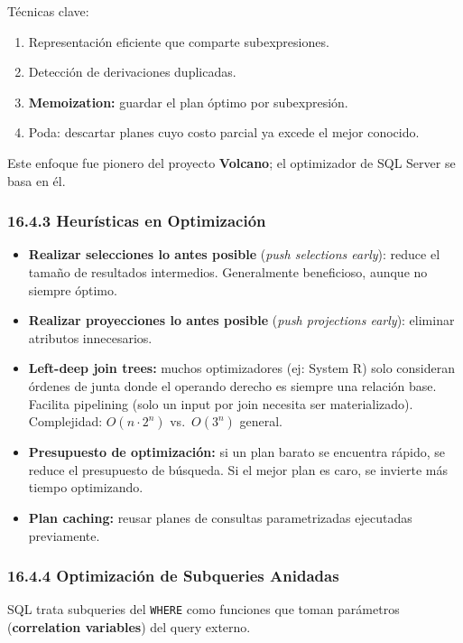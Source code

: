 \documentclass[11pt, a4paper]{article}
\begin{document}
Técnicas clave:
\begin{enumerate}[nosep]
	\item Representación eficiente que comparte subexpresiones.
	\item Detección de derivaciones duplicadas.
	\item \textbf{Memoization:} guardar el plan óptimo por subexpresión.
	\item Poda: descartar planes cuyo costo parcial ya excede el mejor conocido.
\end{enumerate}

Este enfoque fue pionero del proyecto \textbf{Volcano}; el optimizador de SQL Server se basa en él.

\subsubsection{16.4.3 Heurísticas en Optimización}

\begin{itemize}[nosep]
	\item \textbf{Realizar selecciones lo antes posible} (\textit{push selections early}): reduce el tamaño de resultados intermedios. Generalmente beneficioso, aunque no siempre óptimo.
	\item \textbf{Realizar proyecciones lo antes posible} (\textit{push projections early}): eliminar atributos innecesarios.
	\item \textbf{Left-deep join trees:} muchos optimizadores (ej: System R) solo consideran órdenes de junta donde el operando derecho es siempre una relación base. Facilita pipelining (solo un input por join necesita ser materializado). Complejidad: $O(n \cdot 2^n)$ vs.\ $O(3^n)$ general.
	\item \textbf{Presupuesto de optimización:} si un plan barato se encuentra rápido, se reduce el presupuesto de búsqueda. Si el mejor plan es caro, se invierte más tiempo optimizando.
	\item \textbf{Plan caching:} reusar planes de consultas parametrizadas ejecutadas previamente.
\end{itemize}

\subsubsection{16.4.4 Optimización de Subqueries Anidadas}

SQL trata subqueries del \texttt{WHERE} como funciones que toman parámetros (\textbf{correlation variables}) del query externo.
\end{document}
